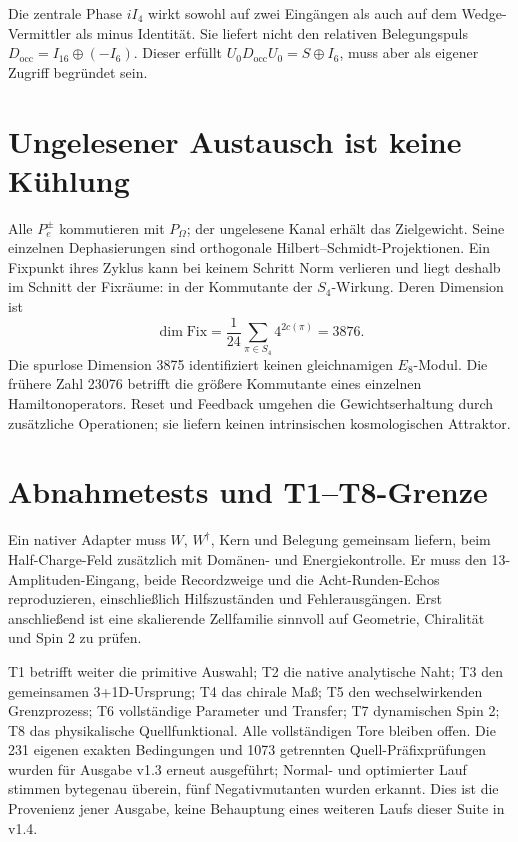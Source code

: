Die zentrale Phase $iI_4$ wirkt sowohl auf zwei Eingängen als auch auf dem Wedge-Vermittler als minus Identität. Sie liefert nicht den relativen Belegungspuls $D_{\mathrm{occ}}=I_{16}\oplus(-I_6)$. Dieser erfüllt $U_0D_{\mathrm{occ}}U_0=S\oplus I_6$, muss aber als eigener Zugriff begründet sein.

\section{Ungelesener Austausch ist keine Kühlung}
Alle $P^\pm_e$ kommutieren mit $P_\Omega$; der ungelesene Kanal erhält das Zielgewicht. Seine einzelnen Dephasierungen sind orthogonale Hilbert--Schmidt-Projektionen. Ein Fixpunkt ihres Zyklus kann bei keinem Schritt Norm verlieren und liegt deshalb im Schnitt der Fixräume: in der Kommutante der $S_4$-Wirkung. Deren Dimension ist
\begin{equation}
\dim\mathrm{Fix}=\frac1{24}\sum_{\pi\in S_4}4^{2c(\pi)}=3876.
\end{equation}
Die spurlose Dimension 3875 identifiziert keinen gleichnamigen $E_8$-Modul. Die frühere Zahl 23076 betrifft die größere Kommutante eines einzelnen Hamiltonoperators. Reset und Feedback umgehen die Gewichtserhaltung durch zusätzliche Operationen; sie liefern keinen intrinsischen kosmologischen Attraktor.

\section{Abnahmetests und T1--T8-Grenze}
Ein nativer Adapter muss $W$, $W^\dagger$, Kern und Belegung gemeinsam liefern, beim Half-Charge-Feld zusätzlich mit Domänen- und Energiekontrolle. Er muss den 13-Amplituden-Eingang, beide Recordzweige und die Acht-Runden-Echos reproduzieren, einschließlich Hilfszuständen und Fehlerausgängen. Erst anschließend ist eine skalierende Zellfamilie sinnvoll auf Geometrie, Chiralität und Spin 2 zu prüfen.

T1 betrifft weiter die primitive Auswahl; T2 die native analytische Naht; T3 den gemeinsamen 3+1D-Ursprung; T4 das chirale Maß; T5 den wechselwirkenden Grenzprozess; T6 vollständige Parameter und Transfer; T7 dynamischen Spin 2; T8 das physikalische Quellfunktional. Alle vollständigen Tore bleiben offen. Die 231 eigenen exakten Bedingungen und 1073 getrennten Quell-Präfixprüfungen wurden für Ausgabe v1.3 erneut ausgeführt; Normal- und optimierter Lauf stimmen bytegenau überein, fünf Negativmutanten wurden erkannt. Dies ist die Provenienz jener Ausgabe, keine Behauptung eines weiteren Laufs dieser Suite in v1.4.
